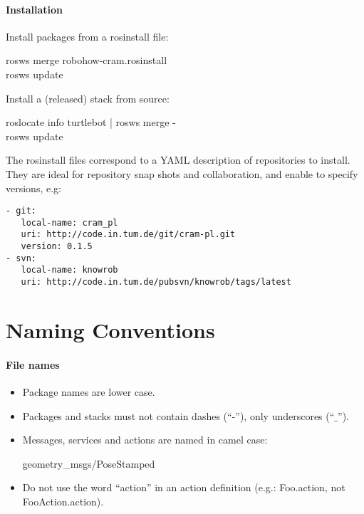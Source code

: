 \paragraph{Installation}
Install packages from a rosinstall file:\\
\begin{tt}
rosws merge robohow-cram.rosinstall\\
rosws update\\
\end{tt}
Install a (released) stack from source:\\
\begin{tt}
roslocate info turtlebot | rosws merge -\\
rosws update
\end{tt}

The rosinstall files correspond to a YAML description of repositories to install.
They are ideal for repository snap shots and collaboration, and enable to specify versions, e.g:
\begin{verbatim}
- git:
   local-name: cram_pl
   uri: http://code.in.tum.de/git/cram-pl.git
   version: 0.1.5
- svn:
   local-name: knowrob
   uri: http://code.in.tum.de/pubsvn/knowrob/tags/latest
\end{verbatim}


\section{Naming Conventions}
\paragraph{File names}
\begin{itemize}
\item Package names are lower case.
\item Packages and stacks must not contain dashes (“-”), only underscores (“$\_$”).
\item Messages, services and actions are named in camel case:
\begin{tt}geometry\_msgs/PoseStamped \end{tt}
\item Do not use the word “action” in an action definition (e.g.: Foo.action, not FooAction.action).
\end{itemize}

